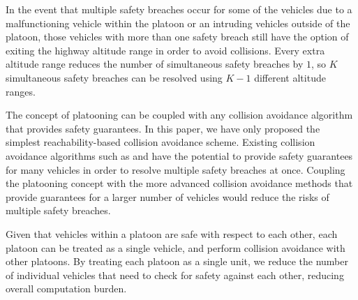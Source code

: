 In the event that multiple safety breaches occur for some of the vehicles due to a malfunctioning vehicle within the platoon or an intruding vehicles outside of the platoon, those vehicles with more than one safety breach still have the option of exiting the highway altitude range in order to avoid collisions. Every extra altitude range reduces the number of simultaneous safety breaches by $1$, so $K$ simultaneous safety breaches can be resolved using $K-1$ different altitude ranges. 

The concept of platooning can be coupled with any collision avoidance algorithm that provides safety guarantees. In this paper, we have only proposed the simplest reachability-based collision avoidance scheme. Existing collision avoidance algorithms such as \cite{SPPPaper} and \cite{MIPPaper} have the potential to provide safety guarantees for many vehicles in order to resolve multiple safety breaches at once. Coupling the platooning concept with the more advanced collision avoidance methods that provide guarantees for a larger number of vehicles would reduce the risks of multiple safety breaches.

Given that vehicles within a platoon are safe with respect to each other, each platoon can be treated as a single vehicle, and perform collision avoidance with other platoons. By treating each platoon as a single unit, we reduce the number of individual vehicles that need to check for safety against each other, reducing overall computation burden.